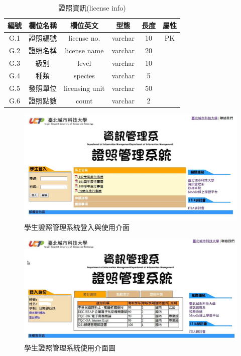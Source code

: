 \begin{table}[H]
\caption{證照資訊(license info)}
\label{tab:證照資訊}
\renewcommand{\arraystretch}{1} %
\arrayrulewidth=0.5pt               %
\centering
\begin{tabular}[t]{|c|c|c|c|c|c|}  %
\hline
編號 & 欄位名稱 & 欄位英文 & 型態 & 長度 & 屬性 \\
\hline
G.1 & 證照編號 & license no. & varchar & 10 & PK \\
\hline
G.2 & 證照名稱 & license name & varchar & 20 &  \\
\hline
G.3 & 級別 & level & varchar & 10 & \\
\hline
G.4 & 種類 & species & varchar & 5 & \\
\hline
G.5 & 發照單位 & licensing unit & varchar & 50 & \\
\hline
G.6 & 證照點數 & count & varchar & 2 & \\
\hline
\end{tabular}
\end{table}

\begin{figure}[h]
\centering \includegraphics[width=17cm,keepaspectratio]{ch3/login}
\caption{\label{fig:login}學生證照管理系統登入與使用介面}
\end{figure}

\begin{figure}[h]
\centering \includegraphics[width=17cm,keepaspectratio]{ch3/homepage}
\caption{\label{fig:homepage}學生證照管理系統使用介面圖}
\end{figure}


